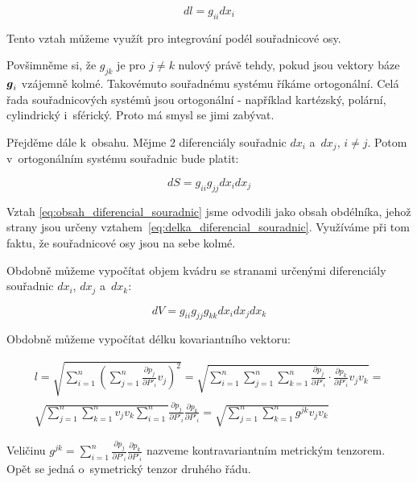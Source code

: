 \begin{equation}
\label{eq:delka_diferencial_souradnic}
dl = g_{ii} dx_i
\end{equation}

Tento vztah můžeme využít pro integrování podél souřadnicové osy.

Povšimněme si, že \(g_{jk}\) je pro \(j \neq k\) nulový právě tehdy, pokud jsou vektory báze \(\boldsymbol{g}_i\) vzájemně kolmé. Takovémuto souřadnému systému říkáme ortogonální. Celá řada souřadnicových systémů jsou ortogonální - například kartézský, polární, cylindrický i~sférický. Proto má smysl se jimi zabývat.

Přejděme dále k~obsahu. Mějme 2 diferenciály souřadnic \(dx_i\) a~\(dx_j\), \(i \neq j\). Potom v~ortogonálním systému souřadnic bude platit:

\begin{equation}
\label{eq:obsah_diferencial_souradnic}
dS = g_{ii} g_{jj} dx_i dx_j
\end{equation}

Vztah \eqref{eq:obsah_diferencial_souradnic} jsme odvodili jako obsah obdélníka, jehož strany jsou určeny vztahem~\eqref{eq:delka_diferencial_souradnic}. Využíváme při tom faktu, že souřadnicové osy jsou na sebe kolmé.

Obdobně můžeme vypočítat objem kvádru se stranami určenými diferenciály souřadnic \(dx_i\), \(dx_j\) a~\(dx_k\):

\begin{equation}
\label{eq:objem_diferencial_souradnic}
dV = g_{ii} g_{jj} g_{kk} dx_i dx_j dx_k
\end{equation}

Obdobně můžeme vypočítat délku kovariantního vektoru:

\begin{equation}
\begin{split}
l = \sqrt{\sum_{i=1}^n \left(\sum_{j=1}^n \frac{\partial p_j}{\partial P'_i} v_j \right)^2} = \sqrt{\sum_{i=1}^n \sum_{j=1}^n \sum_{k=1}^n \frac{\partial p_j}{\partial P'_i} \cdot \frac{\partial p_k}{\partial P'_i} v_j v_k} = \\
\sqrt{\sum_{j=1}^n \sum_{k=1}^n v_j v_k \sum_{i=1}^n} \frac{\partial p_j}{\partial P'_i} \frac{\partial p_k}{\partial P'_i} = \sqrt{\sum_{j=1}^n \sum_{k=1}^n g^{jk} v_j v_k}
\end{split}
\end{equation}

Veličinu \(g^{jk} = \sum_{i=1}^n \frac{\partial p_j}{\partial P'_i} \frac{\partial p_k}{\partial P'_i}\) nazveme kontravariantním metrickým tenzorem. Opět se jedná o~symetrický tenzor druhého řádu.


